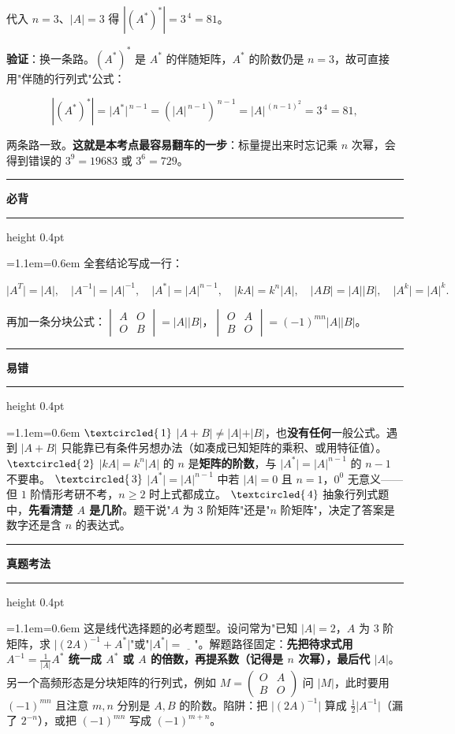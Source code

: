 \documentclass[11pt,openany,UTF8]{ctexbook}
\newcommand{\circled}[1]{\textcircled{\scriptsize\,#1}}
\newcommand{\callouthead}[2]{%
  \par\addvspace{7pt}\noindent
  {\color{#1}\rule[-0.15em]{3pt}{1.05em}}\hspace{0.5em}%
  {\bfseries\color{#1}#2}\par\nobreak\vspace{-0.35em}%
  {\color{rulesep}\hrule height 0.4pt}\nobreak\vspace{0.45em}%
  \begingroup\small\setlength{\parindent}{0pt}%
  \leftskip=1.1em\rightskip=0.6em\noindent\ignorespaces}
\newcommand{\calloutend}{\par\endgroup\addvspace{7pt}}
\newenvironment{callkey}[1]{\callouthead{keybar}{#1}}{\calloutend}
\newenvironment{callwarn}[1]{\callouthead{warnbar}{#1}}{\calloutend}
\newenvironment{callexam}[1]{\callouthead{exambar}{#1}}{\calloutend}
\begin{document}
代入 $n=3$、$\vert A\vert=3$ 得 $\left\vert (A^*)^*\right\vert=3^{\,4}=81$。

\textbf{验证}：换一条路。$(A^*)^*$ 是 $A^*$ 的伴随矩阵，$A^*$ 的阶数仍是 $n=3$，故可直接用"伴随的行列式"公式：

\[\left\vert (A^*)^*\right\vert=\vert A^*\vert^{\,n-1}=\left(\vert A\vert^{\,n-1}\right)^{\,n-1}=\vert A\vert^{\,(n-1)^2}=3^{\,4}=81,\]

两条路一致。\textbf{这就是本考点最容易翻车的一步}：标量提出来时忘记乘 $n$ 次幂，会得到错误的 $3^9=19683$ 或 $3^6=729$。

\begin{callkey}{必背}
全套结论写成一行：

\[\vert A^T\vert=\vert A\vert,\quad \vert A^{-1}\vert=\vert A\vert^{-1},\quad \vert A^*\vert=\vert A\vert^{n-1},\quad \vert kA\vert=k^n\vert A\vert,\quad \vert AB\vert=\vert A\vert\vert B\vert,\quad \vert A^k\vert=\vert A\vert^k .\]

再加一条分块公式：$\begin{vmatrix}A&O\\O&B\end{vmatrix}=\vert A\vert\vert B\vert$，$\begin{vmatrix}O&A\\B&O\end{vmatrix}=(-1)^{mn}\vert A\vert\vert B\vert$。

\end{callkey}

\begin{callwarn}{易错}
$\circled{1}$ $\vert A+B\vert\ne\vert A\vert+\vert B\vert$，也\textbf{没有任何}一般公式。遇到 $\vert A+B\vert$ 只能靠已有条件另想办法（如凑成已知矩阵的乘积、或用特征值）。 $\circled{2}$ $\vert kA\vert=k^n\vert A\vert$ 的 $n$ 是\textbf{矩阵的阶数}，与 $\vert A^*\vert=\vert A\vert^{n-1}$ 的 $n-1$ 不要串。 $\circled{3}$ $\vert A^*\vert=\vert A\vert^{n-1}$ 中若 $\vert A\vert=0$ 且 $n=1$，$0^0$ 无意义——但 $1$ 阶情形考研不考，$n\ge2$ 时上式都成立。 $\circled{4}$ 抽象行列式题中，\textbf{先看清楚 $A$ 是几阶}。题干说"$A$ 为 $3$ 阶矩阵"还是"$n$ 阶矩阵"，决定了答案是数字还是含 $n$ 的表达式。

\end{callwarn}

\begin{callexam}{真题考法}
这是线代选择题的必考题型。设问常为"已知 $\vert A\vert=2$，$A$ 为 $3$ 阶矩阵，求 $\vert (2A)^{-1}+A^*\vert$"或"$\vert A^*\vert=\underline{\quad}$"。解题路径固定：\textbf{先把待求式用 $A^{-1}=\frac{1}{\vert A\vert}A^*$ 统一成 $A^*$ 或 $A$ 的倍数，再提系数（记得是 $n$ 次幂），最后代 $\vert A\vert$}。另一个高频形态是分块矩阵的行列式，例如 $M=\begin{pmatrix}O&A\\B&O\end{pmatrix}$ 问 $\vert M\vert$，此时要用 $(-1)^{mn}$ 且注意 $m,n$ 分别是 $A,B$ 的阶数。陷阱：把 $\vert (2A)^{-1}\vert$ 算成 $\frac{1}{2}\vert A^{-1}\vert$（漏了 $2^{-n}$），或把 $(-1)^{mn}$ 写成 $(-1)^{m+n}$。

\end{callexam}
\end{document}
